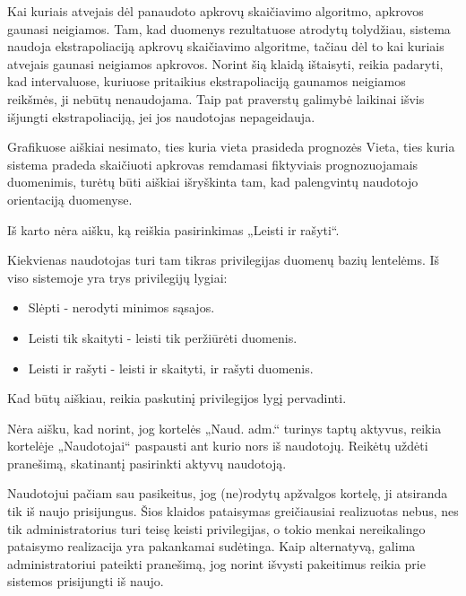 {
  Kai kuriais atvejais dėl panaudoto apkrovų skaičiavimo algoritmo,
  apkrovos gaunasi neigiamos.
}
{
  Tam, kad duomenys rezultatuose atrodytų tolydžiau, sistema naudoja
  ekstrapoliaciją apkrovų skaičiavimo algoritme, tačiau dėl to kai kuriais
  atvejais gaunasi neigiamos apkrovos. Norint šią klaidą ištaisyti, reikia
  padaryti, kad intervaluose, kuriuose pritaikius ekstrapoliaciją gaunamos
  neigiamos reikšmės, ji nebūtų nenaudojama. Taip pat praverstų galimybė
  laikinai išvis išjungti ekstrapoliaciją, jei jos naudotojas nepageidauja.
}

{
  Grafikuose aiškiai nesimato, ties kuria vieta prasideda prognozės
}
{
  Vieta, ties kuria sistema pradeda skaičiuoti apkrovas remdamasi fiktyviais
  prognozuojamais duomenimis, turėtų būti aiškiai išryškinta tam, kad
  palengvintų naudotojo orientaciją duomenyse.
}

{
  Iš karto nėra aišku, ką reiškia pasirinkimas „Leisti ir rašyti“.
}
{
  Kiekvienas naudotojas turi tam tikras privilegijas duomenų bazių lentelėms.
  Iš viso sistemoje yra trys privilegijų lygiai:
  \begin{itemize}
    \item Slėpti - nerodyti minimos sąsajos.
    \item Leisti tik skaityti - leisti tik peržiūrėti duomenis.
    \item Leisti ir rašyti - leisti ir skaityti, ir rašyti duomenis.
  \end{itemize}
  Kad būtų aiškiau, reikia paskutinį privilegijos lygį pervadinti.
}

{
  Nėra aišku, kad norint, jog kortelės „Naud. adm.“ turinys taptų aktyvus,
  reikia kortelėje „Naudotojai“ paspausti ant kurio nors iš naudotojų.
}
{
  Reikėtų uždėti pranešimą, skatinantį pasirinkti aktyvų naudotoją.
}

{
  Naudotojui pačiam sau pasikeitus, jog (ne)rodytų apžvalgos kortelę, ji
  atsiranda tik iš naujo prisijungus.
}
{
  Šios klaidos pataisymas greičiausiai realizuotas nebus, nes tik administratorius
  turi teisę keisti privilegijas, o tokio menkai nereikalingo pataisymo realizacija
  yra pakankamai sudėtinga. Kaip alternatyvą, galima administratoriui pateikti pranešimą,
  jog norint išvysti pakeitimus reikia prie sistemos prisijungti iš naujo.
}

